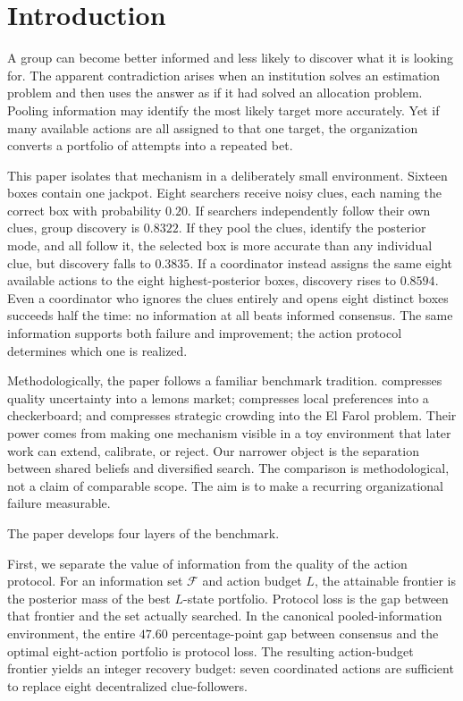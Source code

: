 \documentclass[11pt]{article}
\theoremstyle{definition}
\theoremstyle{remark}
\newcommand{\1}{\mathbf{1}}
\newcommand{\F}{\mathcal{F}}
\begin{document}
\section{Introduction}

A group can become better informed and less likely to discover what it is looking for. The apparent contradiction arises when an institution solves an estimation problem and then uses the answer as if it had solved an allocation problem. Pooling information may identify the most likely target more accurately. Yet if many available actions are all assigned to that one target, the organization converts a portfolio of attempts into a repeated bet.

This paper isolates that mechanism in a deliberately small environment. Sixteen boxes contain one jackpot. Eight searchers receive noisy clues, each naming the correct box with probability $0.20$. If searchers independently follow their own clues, group discovery is $0.8322$. If they pool the clues, identify the posterior mode, and all follow it, the selected box is more accurate than any individual clue, but discovery falls to $0.3835$. If a coordinator instead assigns the same eight available actions to the eight highest-posterior boxes, discovery rises to $0.8594$. Even a coordinator who ignores the clues entirely and opens eight distinct boxes succeeds half the time: no information at all beats informed consensus. The same information supports both failure and improvement; the action protocol determines which one is realized.

Methodologically, the paper follows a familiar benchmark tradition. \citet{Akerlof1970} compresses quality uncertainty into a lemons market; \citet{Schelling1971} compresses local preferences into a checkerboard; and \citet{Arthur1994} compresses strategic crowding into the El Farol problem. Their power comes from making one mechanism visible in a toy environment that later work can extend, calibrate, or reject. Our narrower object is the separation between shared beliefs and diversified search. The comparison is methodological, not a claim of comparable scope. The aim is to make a recurring organizational failure measurable.

The paper develops four layers of the benchmark.

First, we separate the value of information from the quality of the action protocol. For an information set $\F$ and action budget $L$, the attainable frontier is the posterior mass of the best $L$-state portfolio. Protocol loss is the gap between that frontier and the set actually searched. In the canonical pooled-information environment, the entire $47.60$ percentage-point gap between consensus and the optimal eight-action portfolio is protocol loss. The resulting action-budget frontier yields an integer recovery budget: seven coordinated actions are sufficient to replace eight decentralized clue-followers.
\end{document}
